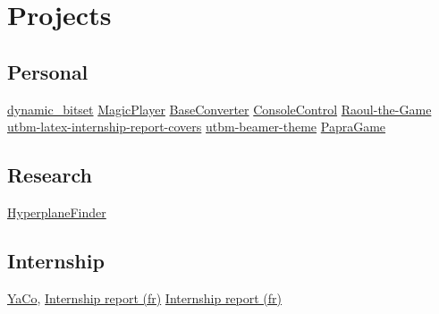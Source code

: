 \documentclass[letterpaper,10pt,sans]{moderncv}
\begin{document}

	\vspace*{\deletedSpace}
	\section{Projects}
		\subsection{Personal}
				{\href{https://github.com/pinam45/dynamic_bitset}{dynamic\_bitset}}
				{\href{https://github.com/pinam45/MagicPlayer}{MagicPlayer}}
				{\href{https://github.com/pinam45/BaseConverter}{BaseConverter}}
				{\href{https://github.com/pinam45/ConsoleControl}{ConsoleControl}}
				{\href{https://github.com/TiWinDeTea/Raoul-the-Game}{Raoul-the-Game}}
				{\href{https://github.com/pinam45/utbm-latex-internship-report-covers}{utbm-latex-internship-report-covers}}
				{\href{https://github.com/pinam45/utbm-beamer-theme}{utbm-beamer-theme}}
				{\href{https://github.com/TiWinDeTea/PapraGame}{PapraGame}}
		\subsection{Research}
				{\href{https://github.com/Lomadriel/HyperplaneFinder}{HyperplaneFinder}}
		\subsection{Internship}
				{\href{https://github.com/DGA-MI-SSI/YaCo}{YaCo}, \href{https://github.com/pinam45/UTBM_ST40_Rapport_de_stage_DGA}{Internship report (fr)}}
				{\href{https://github.com/pinam45/UTBM_ST40_Rapport_de_stage_DGA}{Internship report (fr)}}
\end{document}
